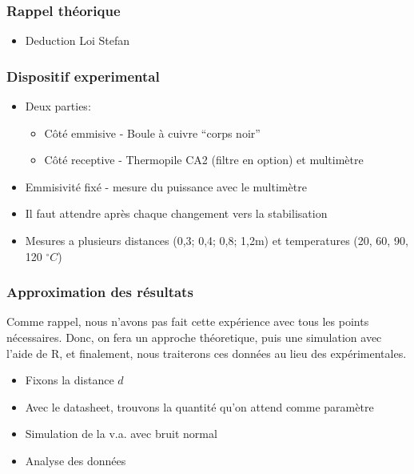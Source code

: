 \documentclass{beamer}
\newcommand{\newlines}{\newline\newline}
\begin{document}
\begin{frame}
\frametitle{Rappel théorique}

\begin{itemize}
	\item{Deduction Loi Stefan}

\end{itemize}

\end{frame}





\begin{frame}
\frametitle{Dispositif experimental}

\begin{itemize}
	\item{Deux parties:\newline
	\begin{itemize}
		\item{Côté emmisive - Boule à cuivre ``corps noir''\newline}
		\item{Côté receptive - Thermopile CA2 (filtre en option) et multimètre\newlines}
	\end{itemize}}
	\item{Emmisivité fixé - mesure du puissance avec le multimètre\newline}
	\item{Il faut attendre après chaque changement vers la stabilisation\newline}
	\item{Mesures a plusieurs distances (0,3; 0,4; 0,8; 1,2m) et temperatures (20, 60, 90, 120 $^\circ C$)}
	
\end{itemize}	
	
\end{frame}





\begin{frame}
\frametitle{Approximation des résultats}

Comme rappel, nous n'avons pas fait cette expérience avec tous les points nécessaires. Donc, on fera un approche théoretique, puis une simulation avec l'aide de R, et finalement, nous traiterons ces données au lieu des expérimentales.
	
\begin{itemize}
	\item{Fixons la distance $d$}
	\item{Avec le datasheet, trouvons la quantité qu'on attend comme paramètre}
	\item{Simulation de la v.a. avec bruit normal}
	\item{Analyse des données}

\end{itemize}
\end{frame}
\end{document}
